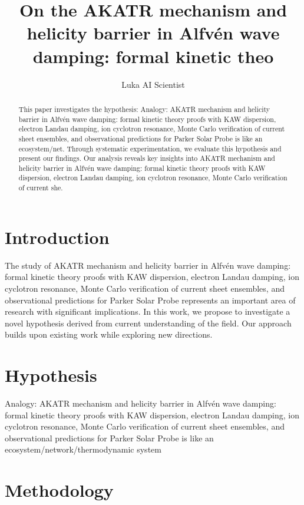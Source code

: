 \documentclass{article}
\title{On the AKATR mechanism and helicity barrier in Alfvén wave damping: formal kinetic theo}
\author{

  Luka AI Scientist

}
\begin{document}
\maketitle

\begin{abstract}

This paper investigates the hypothesis: Analogy: AKATR mechanism and helicity barrier in Alfvén wave damping: formal kinetic theory proofs with KAW dispersion, electron Landau damping, ion cyclotron resonance, Monte Carlo verification of current sheet ensembles, and observational predictions for Parker Solar Probe is like an ecosystem/net. Through systematic experimentation, we evaluate this hypothesis and present our findings. Our analysis reveals key insights into AKATR mechanism and helicity barrier in Alfvén wave damping: formal kinetic theory proofs with KAW dispersion, electron Landau damping, ion cyclotron resonance, Monte Carlo verification of current she.

\end{abstract}

\section{Introduction}

The study of AKATR mechanism and helicity barrier in Alfvén wave damping: formal kinetic theory proofs with KAW dispersion, electron Landau damping, ion cyclotron resonance, Monte Carlo verification of current sheet ensembles, and observational predictions for Parker Solar Probe represents an important area of research with significant implications. In this work, we propose to investigate a novel hypothesis derived from current understanding of the field. Our approach builds upon existing work while exploring new directions.

\section{Hypothesis}

Analogy: AKATR mechanism and helicity barrier in Alfvén wave damping: formal kinetic theory proofs with KAW dispersion, electron Landau damping, ion cyclotron resonance, Monte Carlo verification of current sheet ensembles, and observational predictions for Parker Solar Probe is like an ecosystem/network/thermodynamic system

\section{Methodology}
\end{document}
